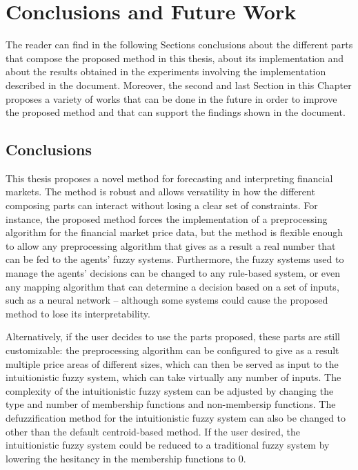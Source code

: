 \chapter{Conclusions and Future Work}
\label{chapter:conclusions-and-future-work}

The reader can find in the following Sections conclusions about the different
parts that compose the proposed method in this thesis, about its implementation
and about the results obtained in the experiments involving the implementation
described in the document. Moreover, the second and last Section in this Chapter
proposes a variety of works that can be done in the future in order to improve
the proposed method and that can support the findings shown in the document.

\section{Conclusions}
\label{section:conclusions}

This thesis proposes a novel method for forecasting and interpreting financial
markets. The method is robust and allows versatility in how the
different composing parts can interact without losing a clear set of
constraints. For instance, the proposed method forces the implementation of a
preprocessing algorithm for the financial market price data, but the method is
flexible enough to allow any preprocessing algorithm that gives as a result a
real number that can be fed to the agents' fuzzy systems. Furthermore, the fuzzy
systems used to manage the agents' decisions can be changed to any rule-based
system, or even any mapping algorithm that can determine a decision based on a
set of inputs, such as a neural network -- although some systems could cause the
proposed method to lose its interpretability.

Alternatively, if the user decides to use the parts proposed, these parts are
still customizable: the preprocessing algorithm can be configured to give as a
result multiple price areas of different sizes, which can then be served as
input to the intuitionistic fuzzy system, which can take virtually any number of
inputs. The complexity of the intuitionistic fuzzy system can be adjusted by
changing the type and number of membership functions and non-membersip
functions. The defuzzification method for the intuitionistic fuzzy system can
also be changed to other than the default centroid-based method. If the user
desired, the intuitionistic fuzzy system could be reduced to a traditional fuzzy
system by lowering the hesitancy in the membership functions to 0.

